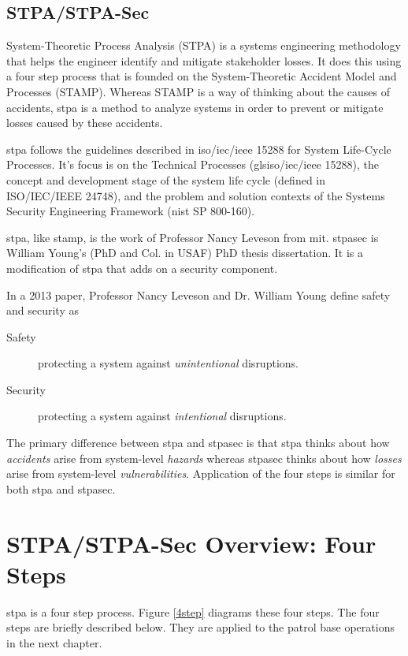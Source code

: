 \documentclass[../../main/main.tex]{subfiles}
\begin{document}
\subsection{STPA/STPA-Sec}\label{ssec:stpa}
System-Theoretic Process Analysis (STPA) is a systems engineering methodology that helps the engineer identify and mitigate stakeholder losses. It does this using a four step process that is founded on the System-Theoretic Accident Model and Processes (STAMP).  Whereas STAMP is a way of thinking about the causes of accidents, \gls{stpa} is a method to analyze systems in order to prevent or mitigate losses caused by these accidents.  

\gls{stpa} follows the guidelines described in \gls{iso}/\gls{iec}/\gls{ieee} 15288 for System Life-Cycle Processes.  It's focus is on the Technical Processes (gls{iso}/\gls{iec}/\gls{ieee} 15288), the concept and development stage of the system life cycle (defined in ISO/IEC/IEEE 24748), and the problem and solution contexts of the Systems Security Engineering Framework (\gls{nist} SP 800-160).

\gls{stpa}, like \gls{stamp}, is the work of Professor Nancy Leveson from \gls{mit}.  \gls{stpasec} is William Young's (PhD and Col. in USAF) PhD thesis dissertation.  It is a modification of \gls{stpa} that adds on a security component.  

In a 2013 paper, Professor Nancy Leveson and Dr. William Young define safety and security as
\begin{description}
\item[ Safety ] protecting a system against \textit{unintentional} disruptions.
\item[ Security ] protecting a system against \textit{intentional} disruptions.
\end{description}
The primary difference between \gls{stpa} and \gls{stpasec} is that \gls{stpa} thinks about how \textit{accidents} arise from system-level \textit{hazards} whereas \gls{stpasec} thinks about how \textit{losses} arise from system-level \textit{vulnerabilities}.  Application of the four steps is similar for both \gls{stpa} and \gls{stpasec}.


\section{STPA/STPA-Sec Overview: Four Steps}
\gls{stpa} is a four step process.  Figure \ref{4step} diagrams these four steps.  The four steps are briefly described below.  They are applied to the patrol base operations in the next chapter. 
\end{document}
